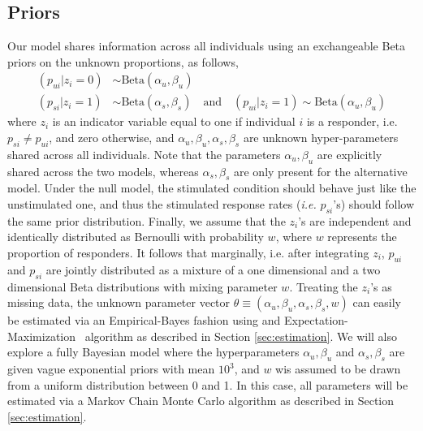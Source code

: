 \documentclass[11pt]{article}
\begin{document}
\subsection{Priors}
Our model shares information across all individuals using an exchangeable Beta priors on the unknown proportions, as follows, 
 \begin{align}
(p_{ui} | z_{i}=0)  &\sim \mathrm{Beta}(\alpha_u, \beta_u)\label{eq:prior-null}\\
(p_{si} | z_{i}=1)  &\sim \mathrm{Beta}(\alpha_s,\beta_s) \quad\mathrm{and}\quad (p_{ui}|z_{i}=1) \sim \mathrm{Beta}(\alpha_u, \beta_u) \label{eq:prior-alternative}
 \end{align}
where $z_i$ is an indicator variable equal to one if individual $i$ is a responder, i.e.  $p_{si}\ne p_{ui}$, and zero otherwise, and $\alpha_u, \beta_u, \alpha_s,\beta_s$ are unknown hyper-parameters shared across all individuals. Note that the parameters $\alpha_u, \beta_u$ are explicitly shared across the two models, whereas $\alpha_s,\beta_s$ are only present for the alternative model. Under the null model, the stimulated condition should behave just like the unstimulated one, and thus the stimulated response rates (\textit{i.e.} $p_{si}$'s) should follow the same prior distribution. Finally, we assume that the $z_i$'s are independent and identically distributed as Bernoulli with probability $w$, where $w$ represents the proportion of responders. It follows that marginally, i.e. after integrating $z_i$, $p_{ui}$ and $p_{si}$ are jointly distributed as a mixture of a one dimensional and a two dimensional Beta distributions with mixing parameter $w$. Treating the $z_i$'s as missing data, the unknown parameter vector $\theta\equiv(\alpha_u, \beta_u, \alpha_s,\beta_s, w)$ can easily be estimated via an Empirical-Bayes fashion using and Expectation-Maximization~\cite{Dempster:1977ul} algorithm as described in Section \ref{sec:estimation}. We will also explore a fully Bayesian model where the hyperparameters $\alpha_u, \beta_u$ and $\alpha_s, \beta_s$ are given vague exponential priors with mean $10^3$, and $w$ wis assumed to be drawn from a uniform distribution between 0 and 1. In this case, all parameters will be estimated via a Markov Chain Monte Carlo algorithm as described in Section \ref{sec:estimation}. 
\end{document}

